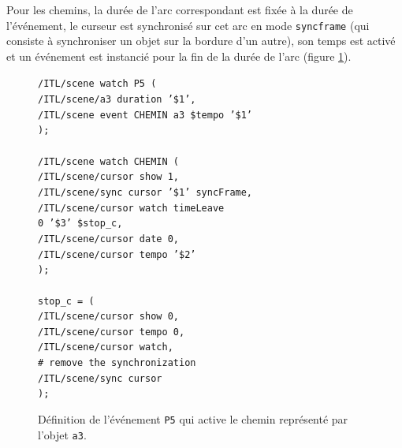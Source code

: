 \documentclass{article}
\newcommand{\OSC}[1]	{{\fontsize{9pt}{9pt} \selectfont\texttt{#1}}}
\newcommand{\sample}[1]		{\vspace{-0.2em}\begin{center}\colorbox{mygrey}{\begin{minipage}[t]{0.98\columnwidth} {\small \texttt{#1}}\end{minipage}}\end{center}}
\begin{document}
Pour les chemins, la durée de l'arc correspondant est fixée à la durée de l'événement, le curseur est synchronisé sur cet arc en mode \OSC{syncframe} (qui consiste à synchroniser un objet sur la bordure d'un autre), son temps est activé et un événement est instancié pour la fin de la durée de l'arc (figure \ref{fig:chemin}).
\begin{figure}[h]
   \centering
\sample{/ITL/scene watch P5 ( \\
\hspace*{4mm}/ITL/scene/a3 duration '\$1', \\
\hspace*{4mm}/ITL/scene event CHEMIN a3 \$tempo '\$1' \\
); \\
\\
/ITL/scene watch CHEMIN ( \\
\hspace*{4mm}/ITL/scene/cursor show 1,\\
\hspace*{4mm}/ITL/scene/sync cursor '\$1' syncFrame,\\
\hspace*{4mm}/ITL/scene/cursor watch timeLeave \\
\hspace*{30mm}0 '\$3' \$stop\_c,\\
\hspace*{4mm}/ITL/scene/cursor date 0,\\
\hspace*{4mm}/ITL/scene/cursor tempo '\$2'\\
); \\
\\
stop\_c = ( \\
\hspace*{4mm}/ITL/scene/cursor show 0,\\
\hspace*{4mm}/ITL/scene/cursor tempo 0, \\
\hspace*{4mm}/ITL/scene/cursor watch,  \\
\hspace*{4mm}\# remove the synchronization \\
\hspace*{4mm}/ITL/scene/sync cursor \\
);
}
   \caption{Définition de l'événement \OSC{P5} qui active le chemin représenté par l'objet \OSC{a3}.}
   \label{fig:chemin}
\end{figure}
\end{document}

